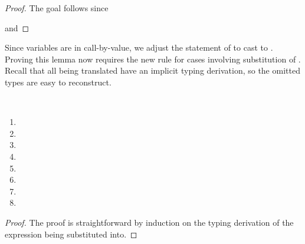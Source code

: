 {\begin{proof}
  The goal follows since

  \im{\cpsfune{\cpsalpha}{\cpsstarty}{\cpsfune{\cpsk}{\cpsfunty{\cpsA}{\cpsalpha}}{
        \cpsncappe{(\cpsnfune{\cpsalpha}{\cpsnfune{\cpsk}{\cpsepr}})}{\cpsalpha}{(\cpsfune{\cpsx}{\cpsB}{\cpsappe{\cpsk}{\cpsx}})}}}
    \stepstar
    \cpsfune{\cpsalpha}{\cpsstarty}{\cpsfune{\cpsk}{\cpsfunty{\cpsA}{\cpsalpha}}{\cpsepr}}}

  and

  \im{\cpsfune{\cpsalpha}{\cpsstarty}{\cpsfune{\cpsk}{\cpsfunty{\cpsA}{\cpsalpha}}{
        \cpscappe{(\cpsnfune{\cpsalpha}{\cpsnfune{\cpsk}{\cpsepr}})}{\cpsalpha}{(\cpsfune{\cpsx}{\cpsB}{\cpsappe{\cpsk}{\cpsx}})}}}
    \stepstar
    \cpsfune{\cpsalpha}{\cpsstarty}{\cpsfune{\cpsk}{\cpsfunty{\cpsA}{\cpsalpha}}{\cpsepr}}}
\end{proof}

Since variables are  in call-by-value, we adjust the statement
of  to cast  to .
Proving this lemma now requires the new  rule
 for cases involving substitution of
.
Recall that all  being translated have an implicit typing
derivation, so the omitted types are easy to reconstruct.

\begin{lemma}
  \label{lem:cps:cbv:subst}
  ~
  \begin{multicols}{2}
  \begin{enumerate}
    \item \im{(\subst{\sK}{\sA}{\salpha})^{+} \equiv \subst{\sK^{+}}{\sA^{+}}{\cpsalpha}}
    \item \im{(\subst{\sK}{\se}{\sx})^{+} \equiv \subst{\sK^{+}}{\cpsncappe{\se^{\div}}{\_}{\cpsidk}}{\cpsx}}
    \item \im{(\subst{\sA}{\sB}{\salpha})^{+} \equiv \subst{\sA^{+}}{\sB^{+}}{\cpsalpha}}
    \item \im{(\subst{\sA}{\se}{\sx})^{+} \equiv \subst{\sA^{+}}{\cpsncappe{\se^{\div}}{\_}{\cpsidk}}{\cpsx}}
    \item \im{(\subst{\sA}{\sB}{\salpha})^{\div} \equiv \subst{\sA^{\div}}{\sB^{+}}{\cpsalpha}}
    \item \im{(\subst{\sA}{\se}{\sx})^{\div} \equiv \subst{\sA^{\div}}{\cpsncappe{\se^{\div}}{\_}{\cpsidk}}{\cpsx}}
    \item \im{(\subst{\se}{\sA}{\salpha})^{\div} \equiv \subst{\se^{\div}}{\sA^{+}}{\cpsalpha}}
    \item \im{(\subst{\se}{\sepr}{\sx})^{\div} \equiv
        \subst{\se^{\div}}{\cpsncappe{\se^{\sprime\div}}{\_}{\cpsidk}}{\cpsx}}
  \end{enumerate}
  \end{multicols}
\end{lemma}
\begin{proof}
  The proof is straightforward by induction on the typing derivation of the
  expression \im{\st} being substituted into.


\end{proof}}
